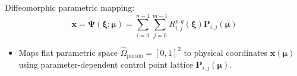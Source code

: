 \documentclass[12pt,a4paper,oneside]{report}
\newcommand{\vect}[1]{\mathbf{#1}}
\begin{document}
Diffeomorphic parametric mapping:
\begin{equation}
    \boldsymbol{x} = \boldsymbol{\Psi}(\boldsymbol{\xi}; \boldsymbol{\mu}) = \sum_{i=0}^{n-1} \sum_{j=0}^{m-1} R_{i,j}^{p,q}(\boldsymbol{\xi}) \vect{P}_{i,j}(\boldsymbol{\mu})
\end{equation}
\begin{tcolorbox}[colback=gray!5!white,colframe=gray!60!black,title={Term Definitions \& Parameter Dependencies}]
\begin{itemize}
    \item Maps flat parametric space $\hat{\Omega}_{\text{param}} = [0,1]^2$ to physical coordinates $\vect{x}(\boldsymbol{\mu})$ using parameter-dependent control point lattice $\vect{P}_{i,j}(\boldsymbol{\mu})$.
\end{itemize}
\end{tcolorbox}
\end{document}
